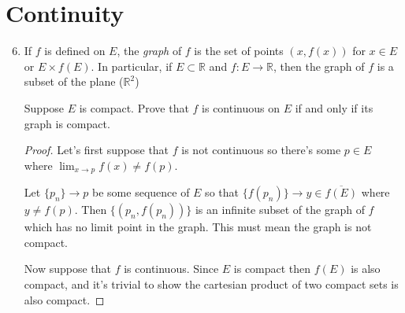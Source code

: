 \documentclass{article}
\begin{document}
\newcommand{\R}{\mathbb{R}}

\setcounter{section}{3}
\section{Continuity}

\begin{enumerate}
\setcounter{enumi}{5}
\item If $f$ is defined on $E$, the \textit{graph} of $f$ is the set of points
      $(x, f(x))$ for $x \in E$ or $E \times f(E)$. In particular, if
      $E \subset \R$ and $f: E \to \R$, then the graph of $f$ is a subset of
      the plane ($\R^2$)

Suppose $E$ is compact. Prove that $f$ is continuous on $E$ if and only if its
graph is compact.

\begin{proof}
Let's first suppose that $f$ is not continuous so there's some $p \in E$ where
$\lim_{x\to p} f(x) \neq f(p)$.

Let $\{p_n\} \to p$ be some sequence of $E$ so that
$\{ f(p_n) \} \to y \in \overline{f(E)}$ where $y \neq f(p)$. Then
$\{ (p_n, f(p_n)) \}$ is an infinite subset of the graph of $f$ which has no
limit point in the graph. This must mean the graph is not compact.

Now suppose that $f$ is continuous. Since $E$ is compact then $f(E)$ is
also compact, and it's trivial to show the cartesian product of two compact sets
is also compact.

\end{proof}
        
\end{enumerate}
\end{document}
